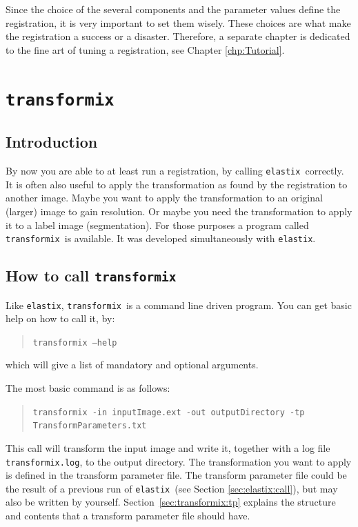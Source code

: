 \documentclass[]{report}
\newcommand{\elastix}{\texttt{elastix}}
\newcommand{\transformix}{\texttt{transformix}}
\begin{document}
Since the choice of the several components and the parameter values
define the registration, it is very important to set them wisely.
These choices are what make the registration a success or a disaster.
Therefore, a separate chapter is dedicated to the fine art of tuning
a registration, see Chapter \ref{chp:Tutorial}.



\chapter{\transformix}\label{chp:transformix}

\section{Introduction}

By now you are able to at least run a registration, by calling
\elastix\ correctly. It is often also useful to apply the
transformation as found by the registration to another image.
Maybe you want to apply the transformation to an original (larger)
image to gain resolution. Or maybe you need the transformation to
apply it to a label image (segmentation). For those purposes a
program called \transformix\ is available. It was developed
simultaneously with \elastix.

\section{How to call \transformix}\label{sec:calltransformix}

Like \elastix, \transformix\ is a command line driven program. You
can get basic help on how to call it, by:
\begin{quote}
\texttt{transformix --help}
\end{quote}
which will give a list of mandatory and optional arguments.

The most basic command is as follows:
\begin{quote}
\texttt{transformix -in inputImage.ext -out outputDirectory -tp
TransformParameters.txt}
\end{quote}
This call will transform the input image and write it, together
with a log file \texttt{transformix.log}, to the output directory.
The transformation you want to apply is defined in the transform
parameter file. The transform parameter file could be the result
of a previous run of \elastix\ (see Section
\ref{sec:elastix:call}), but may also be written by yourself.
Section~\ref{sec:transformix:tp} explains the structure and
contents that a transform parameter file should have.
\end{document}
